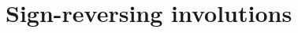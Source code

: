 \documentclass{amsart}
\numberwithin{equation}{section}
\theoremstyle{definition}
\begin{document}











\newpage

\appendix

\section{Sign-reversing involutions}
\label{sec:sign-revers-invol}
\end{document}
